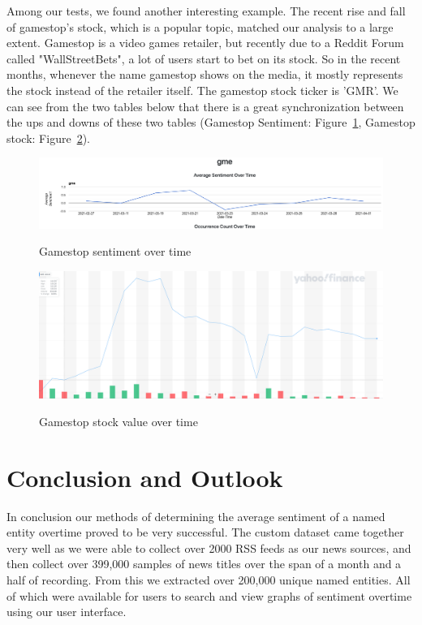 \documentclass[12pt]{article}
\begin{document}
Among our tests, we found another interesting example. The recent rise and fall of gamestop's stock, which is a popular topic, matched our analysis to a large extent. Gamestop is a video games retailer, but recently due to a Reddit Forum called "WallStreetBets", a lot of users start to bet on its stock. So in the recent months, whenever the name gamestop shows on the media, it mostly represents the stock instead of the retailer itself. The gamestop stock ticker is 'GMR'. We can see from the two tables below that there is a great synchronization between the ups and downs of these two tables (Gamestop Sentiment: Figure~\ref{gamestop-sentiment}, Gamestop stock: Figure~\ref{gamestop-stock}).

\begin{figure}[htp]
    \includegraphics[scale=0.25]{gamestop-avg.PNG} \\
\caption{Gamestop sentiment over time}
\label{gamestop-sentiment}
\end{figure}

\begin{figure}[htp]
    \includegraphics[scale=0.25]{gme-stock.PNG} \\
	\caption{Gamestop stock value over time \cite{Yahoo}}
\label{gamestop-stock}
\end{figure}


\section{Conclusion and Outlook}

In conclusion our methods of determining the average sentiment of a named entity overtime proved to be very successful. The custom dataset came together very well as we were able to collect over 2000 RSS feeds as our news sources, and then collect over 399,000 samples of news titles over the span of a month and a half of recording. From this we extracted over 200,000 unique named entities. All of which were available for users to search and view graphs of sentiment overtime using our user interface.
\end{document}
